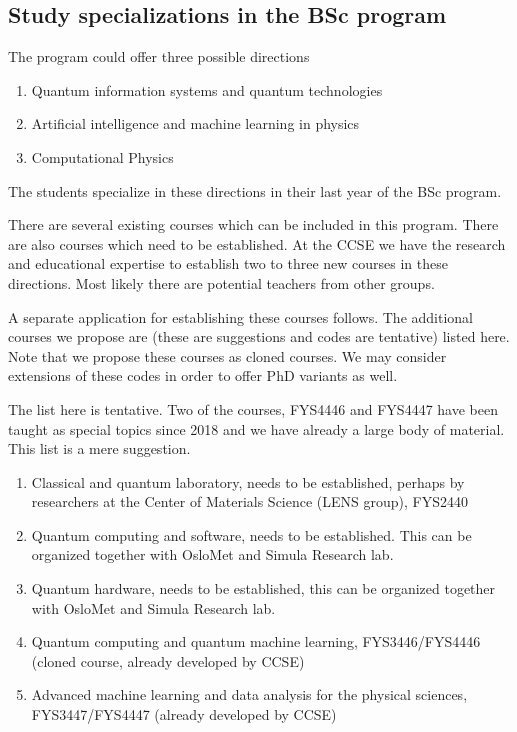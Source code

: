 \documentclass[%
oneside,                 %
final,                   %
10pt]{article}
\begin{document}
\subsection*{Study specializations in the BSc program}

The program could offer  three possible directions
\begin{enumerate}
\item Quantum information systems and quantum technologies

\item Artificial intelligence and machine learning in physics

\item Computational Physics
\end{enumerate}

\noindent
The students specialize in these directions in their last year of the BSc program.

There are several existing courses which can be included in this
program. There are also courses which need to be established. At the
CCSE we have the research and educational expertise to establish two
to three new courses in these directions. Most likely there are
potential teachers from other groups.

A separate application for establishing these courses follows. The
additional courses we propose are (these are suggestions and codes are
tentative) listed here. Note that we propose these courses as cloned
courses. We may consider extensions of these codes in order to offer
PhD variants as well.

The list here is tentative. Two of the courses, FYS4446 and FYS4447 have been taught as special topics since 2018 and we have already a large body of material.
This list is a mere suggestion.

\begin{enumerate}
\item Classical and quantum laboratory, needs to be established, perhaps by researchers at the Center of Materials Science (LENS group), FYS2440

\item Quantum computing and software, needs to be established. This can be organized together with OsloMet and Simula Research lab.

\item Quantum hardware, needs to be established, this can be organized together with OsloMet and Simula Research lab. 

\item Quantum computing and quantum machine learning, FYS3446/FYS4446 (cloned course, already developed by CCSE)

\item Advanced machine learning and data analysis for the physical sciences, FYS3447/FYS4447 (already developed by CCSE)
\end{enumerate}
\end{document}
